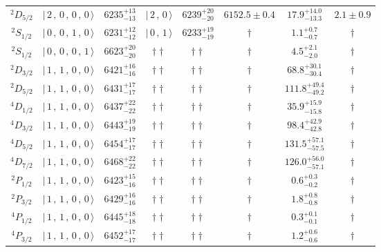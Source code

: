 \begin{tabular}{c| c c c c c c c}
$^{2}D_{5/2}$ & $\vert \,2\,,\,0\,,\,0\,,\,0 \,\rangle $ & $6235^{+13}_{-13}$ & $\vert \,2\,,\,0 \,\rangle$ & $6239^{+20}_{-20}$ & $6152.5\pm 0.4$ & $17.9^{+14.0}_{-13.3}$ & $2.1\pm 0.9$ \\ 
$^{2}S_{1/2}$ & $\vert \,0\,,\,0\,,\,1\,,\,0 \,\rangle $ & $6231^{+12}_{-12}$ & $\vert \,0\,,\,1 \,\rangle$ & $6233^{+19}_{-19}$ & $\dagger$ & $1.1^{+0.7}_{-0.7}$ & $\dagger$ \\ 
$^{2}S_{1/2}$ & $\vert \,0\,,\,0\,,\,0\,,\,1 \,\rangle $ & $6623^{+20}_{-20}$ & $\dagger\dagger$ & $\dagger\dagger$ & $\dagger$ & $4.5^{+2.1}_{-2.0}$ & $\dagger$ \\ 
$^{2}D_{3/2}$ & $\vert \,1\,,\,1\,,\,0\,,\,0 \,\rangle $ & $6421^{+16}_{-16}$ & $\dagger\dagger$ & $\dagger\dagger$ & $\dagger$ & $68.8^{+30.1}_{-30.4}$ & $\dagger$ \\ 
$^{2}D_{5/2}$ & $\vert \,1\,,\,1\,,\,0\,,\,0 \,\rangle $ & $6431^{+17}_{-17}$ & $\dagger\dagger$ & $\dagger\dagger$ & $\dagger$ & $111.8^{+49.4}_{-49.2}$ & $\dagger$ \\ 
$^{4}D_{1/2}$ & $\vert \,1\,,\,1\,,\,0\,,\,0 \,\rangle $ & $6437^{+22}_{-22}$ & $\dagger\dagger$ & $\dagger\dagger$ & $\dagger$ & $35.9^{+15.9}_{-15.8}$ & $\dagger$ \\ 
$^{4}D_{3/2}$ & $\vert \,1\,,\,1\,,\,0\,,\,0 \,\rangle $ & $6443^{+19}_{-19}$ & $\dagger\dagger$ & $\dagger\dagger$ & $\dagger$ & $98.4^{+42.9}_{-42.8}$ & $\dagger$ \\ 
$^{4}D_{5/2}$ & $\vert \,1\,,\,1\,,\,0\,,\,0 \,\rangle $ & $6454^{+17}_{-17}$ & $\dagger\dagger$ & $\dagger\dagger$ & $\dagger$ & $131.5^{+57.1}_{-57.5}$ & $\dagger$ \\ 
$^{4}D_{7/2}$ & $\vert \,1\,,\,1\,,\,0\,,\,0 \,\rangle $ & $6468^{+22}_{-22}$ & $\dagger\dagger$ & $\dagger\dagger$ & $\dagger$ & $126.0^{+56.0}_{-57.1}$ & $\dagger$ \\ 
$^{2}P_{1/2}$ & $\vert \,1\,,\,1\,,\,0\,,\,0 \,\rangle $ & $6423^{+15}_{-16}$ & $\dagger\dagger$ & $\dagger\dagger$ & $\dagger$ & $0.6^{+0.3}_{-0.2}$ & $\dagger$ \\ 
$^{2}P_{3/2}$ & $\vert \,1\,,\,1\,,\,0\,,\,0 \,\rangle $ & $6429^{+16}_{-16}$ & $\dagger\dagger$ & $\dagger\dagger$ & $\dagger$ & $1.8^{+0.8}_{-0.8}$ & $\dagger$ \\ 
$^{4}P_{1/2}$ & $\vert \,1\,,\,1\,,\,0\,,\,0 \,\rangle $ & $6445^{+18}_{-18}$ & $\dagger\dagger$ & $\dagger\dagger$ & $\dagger$ & $0.3^{+0.1}_{-0.1}$ & $\dagger$ \\ 
$^{4}P_{3/2}$ & $\vert \,1\,,\,1\,,\,0\,,\,0 \,\rangle $ & $6452^{+17}_{-17}$ & $\dagger\dagger$ & $\dagger\dagger$ & $\dagger$ & $1.2^{+0.6}_{-0.6}$ & $\dagger$ \\ 

\end{tabular}
